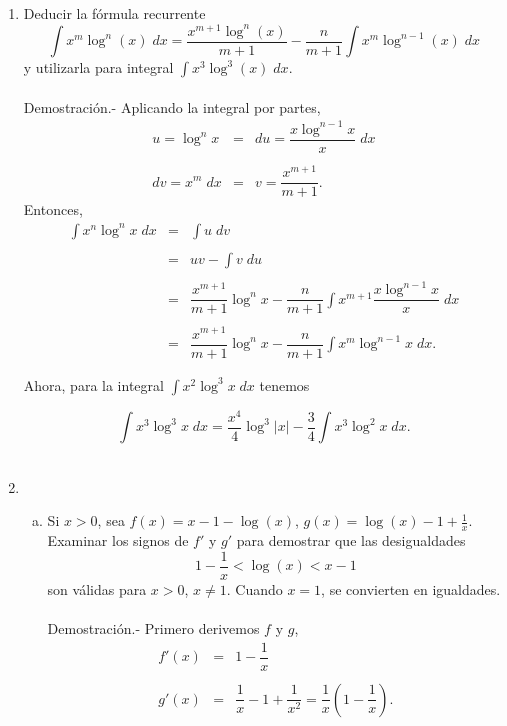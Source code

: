 \begin{enumerate}[\bfseries 1.]
    \item Deducir la fórmula recurrente
    $$\int x^m \log^n(x)\; dx = \dfrac{x^{m+1}\log^n(x)}{m+1}-\dfrac{n}{m+1} \int x^m \log^{n-1}(x)\; dx$$
    y utilizarla para integral $\displaystyle\int x^3 \log^3(x)\; dx$.\\\\
	Demostración.-\; Aplicando la integral por partes,
	$$
	\begin{array}{rcl}
	    u=\log^n x &=& du=\dfrac{x\log^{n-1}x}{x}\; dx\\\\
	    dv=x^m\; dx &=& v=\dfrac{x^{m+1}}{m+1}.
	\end{array}
	$$
	Entonces,
	$$
	\begin{array}{rcl}
	    \displaystyle\int x^n\log^n x\; dx &=& \displaystyle\int u\; dv\\\\
					       &=& uv-\displaystyle\int v\; du\\\\
					       &=& \dfrac{x^{m+1}}{m+1}\log^n x - \dfrac{n}{m+1}\displaystyle\int x^{m+1}\dfrac{x\log^{n-1}x}{x}\; dx\\\\
					       &=& \dfrac{x^{m+1}}{m+1}\log^n x - \dfrac{n}{m+1}\displaystyle\int x^{m}\log^{n-1}x\; dx.
	\end{array}
	$$

	Ahora, para la integral $\displaystyle\int x^2\log^3 x\; dx$ tenemos

	$$\int x^3\log^3 x\; dx = \dfrac{x^4}{4}\log^3|x|-\dfrac{3}{4}\int x^3\log^2 x\; dx.$$\\

    \item 
	\begin{enumerate}[a)]

	    \item  Si $x>0$, sea $f(x)=x-1-\log(x)$, $g(x)=\log(x)-1+\frac{1}{x}$. Examinar los signos de $f'$ y $g'$ para demostrar que las desigualdades
	    $$1-\dfrac{1}{x}<\log(x)<x-1$$
	    son válidas para $x>0$, $x\neq 1$. Cuando $x=1$, se convierten en igualdades.\\\\
		Demostración.-\; Primero derivemos $f$ y $g$,
		$$
		\begin{array}{rcl}
		    f'(x) &=& 1-\dfrac{1}{x}\\\\
		    g'(x) &=& \dfrac{1}{x}-1+\dfrac{1}{x^2}=\dfrac{1}{x}\left(1-\dfrac{1}{x}\right).
		\end{array}
		$$


\end{enumerate}
\end{enumerate}
